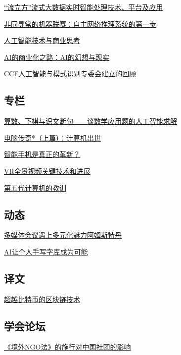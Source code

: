 \documentclass[a4paper]{article}
\begin{document}
\href{http://history.ccf.org.cn/resources/1190201776262/2016/12/13/1chenchun.pdf}{“流立方”流式大数据实时智能处理技术、平台及应用}

\href{http://history.ccf.org.cn/resources/1190201776262/2016/12/13/3Jack Davidson.pdf}{非同寻常的机器联赛：自主网络推理系统的第一步}

\href{http://history.ccf.org.cn/resources/1190201776262/2016/12/13/6wangxiaochuan.pdf}{人工智能技术与商业思考}

\href{http://history.ccf.org.cn/resources/1190201776262/2016/12/13/7lizhifei.pdf}{AI的商业化之路：AI的幻想与现实}

\href{http://history.ccf.org.cn/resources/1190201776262/2016/12/13/8shichunyi.pdf}{CCF人工智能与模式识别专委会建立的回顾}

\subsection{专栏}
\href{http://history.ccf.org.cn/resources/1190201776262/2016/12/13/12shishuming.pdf}{算数、下棋与识文断句——谈数学应用题的人工智能求解}

\href{http://history.ccf.org.cn/resources/1190201776262/2016/12/13/11huangtiejun.pdf}{电脑传奇*（上篇）：计算机出世}

\href{http://history.ccf.org.cn/resources/1190201776262/2016/12/13/13David.pdf}{智能手机是真正的革新？}

\href{http://history.ccf.org.cn/resources/1190201776262/2016/12/13/9wangtao.pdf}{VR全景视频关键技术和进展}

\href{http://history.ccf.org.cn/resources/1190201776262/2016/12/13/10nick.pdf}{第五代计算机的教训}

\subsection{动态}
\href{http://history.ccf.org.cn/resources/1190201776262/2016/12/13/15gantian.pdf}{多媒体会议遇上多元化魅力阿姆斯特丹}

\href{http://history.ccf.org.cn/resources/1190201776262/2016/12/13/14lianzhouhui.pdf}{AI让个人手写字库成为可能}

\subsection{译文}
\href{http://history.ccf.org.cn/resources/1190201776262/2016/12/13/16yiwen.pdf}{超越比特币的区块链技术}

\subsection{学会论坛}
\href{http://history.ccf.org.cn/resources/1190201776262/2016/12/13/17maixn.pdf}{《境外NGO法》的施行对中国社团的影响}
\end{document}
